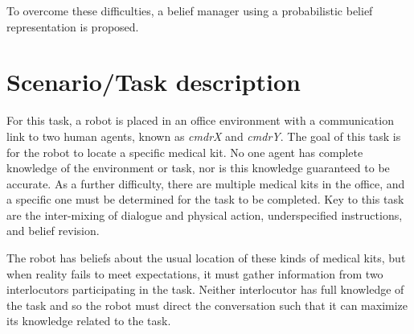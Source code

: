 \documentclass[12pt]{article}
\begin{document}







To overcome these difficulties, a belief manager using a probabilistic
belief representation is proposed.


\section{Scenario/Task description}
For this task, a robot is placed in an office environment with a
communication link to two human agents, known as \textit{cmdrX} and
\textit{cmdrY}. The goal of this task is for the robot to locate a
specific medical kit. No one agent has complete knowledge of the
environment or task, nor is this knowledge guaranteed to be accurate.
As a further difficulty, there are multiple medical kits in the
office, and a specific one must be determined for the task to be
completed. Key to this task are the inter-mixing of dialogue and
physical action, underspecified instructions, and belief revision.

The robot has beliefs about the usual location of these kinds of
medical kits, but when reality fails to meet expectations, it must
gather information from two interlocutors participating in the
task. Neither interlocutor has full knowledge of the task and so the
robot must direct the conversation such that it can maximize its
knowledge related to the task.
\end{document}
